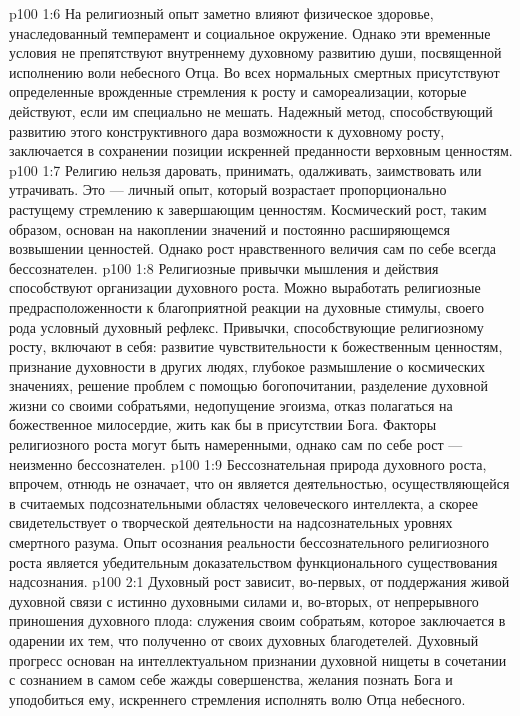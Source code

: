 \vs p100 1:6 \pc На религиозный опыт заметно влияют физическое здоровье, унаследованный темперамент и социальное окружение. Однако эти временные условия не препятствуют внутреннему духовному развитию души, посвященной исполнению воли небесного Отца. Во всех нормальных смертных присутствуют определенные врожденные стремления к росту и самореализации, которые действуют, если им специально не мешать. Надежный метод, способствующий развитию этого конструктивного дара возможности к духовному росту, заключается в сохранении позиции искренней преданности верховным ценностям.
\vs p100 1:7 Религию нельзя даровать, принимать, одалживать, заимствовать или утрачивать. Это --- личный опыт, который возрастает пропорционально растущему стремлению к завершающим ценностям. Космический рост, таким образом, основан на накоплении значений и постоянно расширяющемся возвышении ценностей. Однако рост нравственного величия сам по себе всегда бессознателен.
\vs p100 1:8 Религиозные привычки мышления и действия способствуют организации духовного роста. Можно выработать религиозные предрасположенности к благоприятной реакции на духовные стимулы, своего рода условный духовный рефлекс. Привычки, способствующие религиозному росту, включают в себя: развитие чувствительности к божественным ценностям, признание духовности в других людях, глубокое размышление о космических значениях, решение проблем с помощью богопочитании, разделение духовной жизни со своими собратьями, недопущение эгоизма, отказ полагаться на божественное милосердие, жить как бы в присутствии Бога. Факторы религиозного роста могут быть намеренными, однако сам по себе рост --- неизменно бессознателен.
\vs p100 1:9 Бессознательная природа духовного роста, впрочем, отнюдь не означает, что он является деятельностью, осуществляющейся в считаемых подсознательными областях человеческого интеллекта, а скорее свидетельствует о творческой деятельности на надсознательных уровнях смертного разума. Опыт осознания реальности бессознательного религиозного роста является убедительным доказательством функционального существования надсознания.
\vs p100 2:1 Духовный рост зависит, во\hyp{}первых, от поддержания живой духовной связи с истинно духовными силами и, во\hyp{}вторых, от непрерывного приношения духовного плода: служения своим собратьям, которое заключается в одарении их тем, что полученно от своих духовных благодетелей. Духовный прогресс основан на интеллектуальном признании духовной нищеты в сочетании с сознанием в самом себе жажды совершенства, желания познать Бога и уподобиться ему, искреннего стремления исполнять волю Отца небесного.

